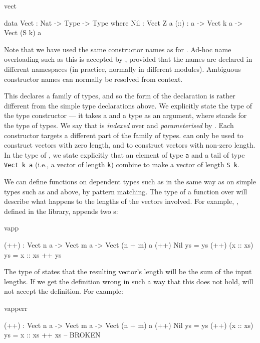 \begin{SaveVerbatim}{vect}

data Vect : Nat -> Type -> Type where
   Nil  : Vect Z a
   (::) : a -> Vect k a -> Vect (S k) a

\end{SaveVerbatim}

\noindent
Note that we have used the same constructor names as for . Ad-hoc
name overloading such as this is accepted by \Idris{}, provided that the names
are declared in different namespaces (in practice, normally in different modules).
Ambiguous constructor names can normally be resolved from context.

This declares a family of types, and so the form of the declaration is rather
different from the simple type declarations above. We explicitly state the type
of the type constructor  --- it takes a  and a type as an
argument, where  stands for the type of types. We say that 
is \emph{indexed} over  and \emph{parameterised} by . Each
constructor targets a different part of the family of types.  can only
be used to construct vectors with zero length, and \tDC{::} to construct
vectors with non-zero length. In the type of \tDC{::}, we state explicitly that an element
of type \texttt{a} and a tail of type \texttt{Vect k a} (i.e., a vector of length \texttt{k})
combine to make a vector of length \texttt{S k}.

We can define functions on dependent types such as  in the same way
as on simple types such as  and  above, by pattern matching.
The type of a function over  will describe what happens to the
lengths of the vectors involved. For example, \tFN{++}, defined in the
library, appends two s:

\begin{SaveVerbatim}{vapp}

(++) : Vect n a -> Vect m a -> Vect (n + m) a
(++) Nil       ys = ys
(++) (x :: xs) ys = x :: xs ++ ys

\end{SaveVerbatim}

\noindent
The type of \tFN{(++)} states that the resulting vector's length will be the sum of
the input lengths. If we get the definition wrong in such a way that this does
not hold, \Idris{} will not accept the definition. For example:

\begin{SaveVerbatim}{vapperr}

(++) : Vect n a -> Vect m a -> Vect (n + m) a
(++) Nil       ys = ys
(++) (x :: xs) ys = x :: xs ++ xs -- BROKEN

\end{SaveVerbatim}

